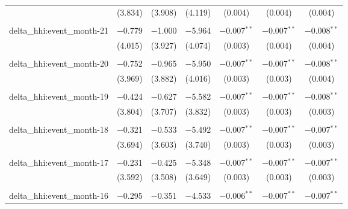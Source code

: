 \begin{table}[H]
{\begin{tabular}{@{\extracolsep{5pt}}lcccccc}
   & (3.834) & (3.908) & (4.119) & (0.004) & (0.004) & (0.004) \\  

   & & & & & & \\  

  delta\_hhi:event\_month-21 & $-$0.779 & $-$1.000 & $-$5.964 & $-$0.007$^{**}$ & $-$0.007$^{**}$ & $-$0.008$^{**}$ \\  

   & (4.015) & (3.927) & (4.074) & (0.003) & (0.004) & (0.004) \\  

   & & & & & & \\  

  delta\_hhi:event\_month-20 & $-$0.752 & $-$0.965 & $-$5.950 & $-$0.007$^{**}$ & $-$0.007$^{**}$ & $-$0.008$^{**}$ \\  

   & (3.969) & (3.882) & (4.016) & (0.003) & (0.003) & (0.004) \\  

   & & & & & & \\  

  delta\_hhi:event\_month-19 & $-$0.424 & $-$0.627 & $-$5.582 & $-$0.007$^{**}$ & $-$0.007$^{**}$ & $-$0.008$^{**}$ \\  

   & (3.804) & (3.707) & (3.832) & (0.003) & (0.003) & (0.003) \\  

   & & & & & & \\  

  delta\_hhi:event\_month-18 & $-$0.321 & $-$0.533 & $-$5.492 & $-$0.007$^{**}$ & $-$0.007$^{**}$ & $-$0.007$^{**}$ \\  

   & (3.694) & (3.603) & (3.740) & (0.003) & (0.003) & (0.003) \\  

   & & & & & & \\  

  delta\_hhi:event\_month-17 & $-$0.231 & $-$0.425 & $-$5.348 & $-$0.007$^{**}$ & $-$0.007$^{**}$ & $-$0.007$^{**}$ \\  

   & (3.592) & (3.508) & (3.649) & (0.003) & (0.003) & (0.003) \\  

   & & & & & & \\  

  delta\_hhi:event\_month-16 & $-$0.295 & $-$0.351 & $-$4.533 & $-$0.006$^{**}$ & $-$0.007$^{**}$ & $-$0.007$^{**}$ \\  


\end{tabular}}
\end{table}
